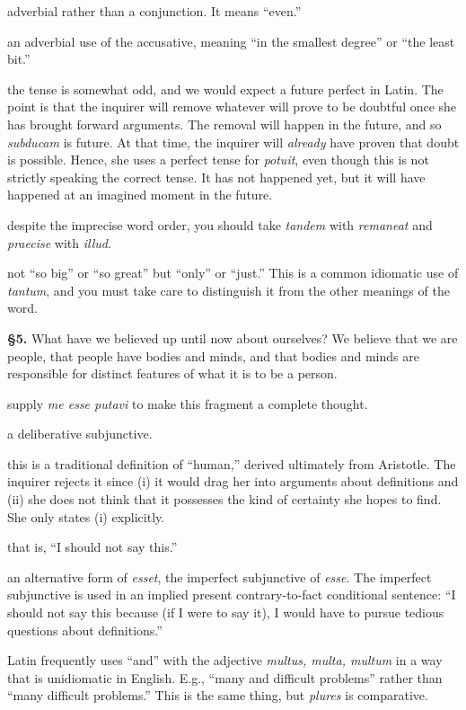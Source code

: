  adverbial rather than a conjunction. It means ``even.''

 an adverbial use of the accusative, meaning ``in the smallest degree'' or ``the least bit.''

 the tense is somewhat odd, and we would expect a future perfect in Latin. The point is that the inquirer will remove whatever will prove to be doubtful once she has brought forward arguments. The removal will happen in the future, and so \textit{subducam} is future. At that time, the inquirer will \textit{already} have proven that doubt is possible. Hence, she uses a perfect tense for \textit{potuit}, even though this is not strictly speaking the correct tense. It has not happened yet, but it will have happened at an imagined moment in the future.

 despite the imprecise word order, you should take \textit{tandem} with \textit{remaneat} and \textit{praecise} with \textit{illud}.

 not ``so big'' or ``so great'' but ``only'' or ``just.'' This is a common idiomatic use of \textit{tantum}, and you must take care to distinguish it from the other meanings of the word.

\textbf{§5.} What have we believed up until now about ourselves? We believe that we are people, that people have bodies and minds, and that bodies and minds are responsible for distinct features of what it is to be a person.

 supply \textit{me esse putavi} to make this fragment a complete thought.

 a deliberative subjunctive.

 this is a traditional definition of ``human,'' derived ultimately from Aristotle. The inquirer rejects it since (i) it would drag her into arguments about definitions and (ii) she does not think that it possesses the kind of certainty she hopes to find. She only states (i) explicitly.

 that is, ``I should not say this.''

 an alternative form of \textit{esset}, the imperfect subjunctive of \textit{esse}. The imperfect subjunctive is used in an implied present contrary-to-fact conditional sentence: ``I should not say this because (if I were to say it), I would have to pursue tedious questions about definitions.''

 Latin frequently uses ``and'' with the adjective \textit{multus, multa, multum} in a way that is unidiomatic in English. E.g., ``many and difficult problems'' rather than ``many difficult problems.'' This is the same thing, but \textit{plures} is comparative.

